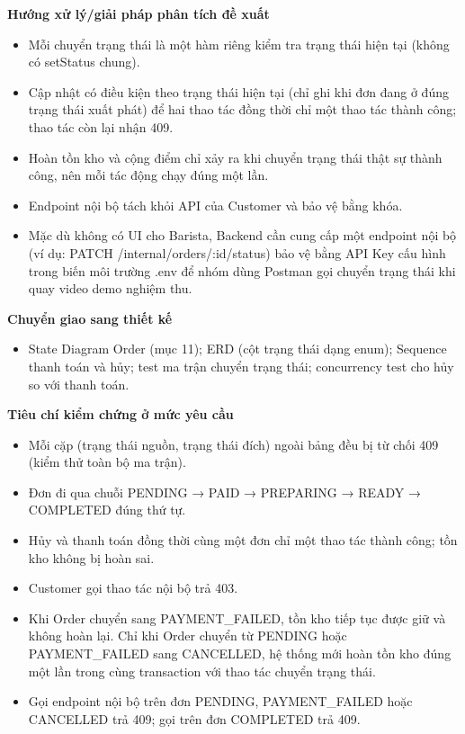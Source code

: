 \documentclass[11pt,a4paper,oneside]{report}
\begin{document}
\textbf{Hướng xử lý/giải pháp phân tích đề xuất}

\begin{itemize}
\item
  Mỗi chuyển trạng thái là một hàm riêng kiểm tra trạng thái hiện tại (không có setStatus chung).
\item
  Cập nhật có điều kiện theo trạng thái hiện tại (chỉ ghi khi đơn đang ở đúng trạng thái xuất phát) để hai thao tác đồng thời chỉ một thao tác thành công; thao tác còn lại nhận 409.
\item
  Hoàn tồn kho và cộng điểm chỉ xảy ra khi chuyển trạng thái thật sự thành công, nên mỗi tác động chạy đúng một lần.
\item
  Endpoint nội bộ tách khỏi API của Customer và bảo vệ bằng khóa.
\item
  Mặc dù không có UI cho Barista, Backend cần cung cấp một endpoint nội bộ (ví dụ: PATCH /internal/orders/:id/status) bảo vệ bằng API Key cấu hình trong biến môi trường .env để nhóm dùng Postman gọi chuyển trạng thái khi quay video demo nghiệm thu.
\end{itemize}

\textbf{Chuyển giao sang thiết kế}

\begin{itemize}
\item
  State Diagram Order (mục 11); ERD (cột trạng thái dạng enum); Sequence thanh toán và hủy; test ma trận chuyển trạng thái; concurrency test cho hủy so với thanh toán.
\end{itemize}

\textbf{Tiêu chí kiểm chứng ở mức yêu cầu}

\begin{itemize}
\item
  Mỗi cặp (trạng thái nguồn, trạng thái đích) ngoài bảng đều bị từ chối 409 (kiểm thử toàn bộ ma trận).
\item
  Đơn đi qua chuỗi PENDING → PAID → PREPARING → READY → COMPLETED đúng thứ tự.
\item
  Hủy và thanh toán đồng thời cùng một đơn chỉ một thao tác thành công; tồn kho không bị hoàn sai.
\item
  Customer gọi thao tác nội bộ trả 403.
\item
  Khi Order chuyển sang PAYMENT\_FAILED, tồn kho tiếp tục được giữ và không hoàn lại. Chỉ khi Order chuyển từ PENDING hoặc PAYMENT\_FAILED sang CANCELLED, hệ thống mới hoàn tồn kho đúng một lần trong cùng transaction với thao tác chuyển trạng thái.
\item
  Gọi endpoint nội bộ trên đơn PENDING, PAYMENT\_FAILED hoặc CANCELLED trả 409; gọi trên đơn COMPLETED trả 409.
\end{itemize}
\end{document}
